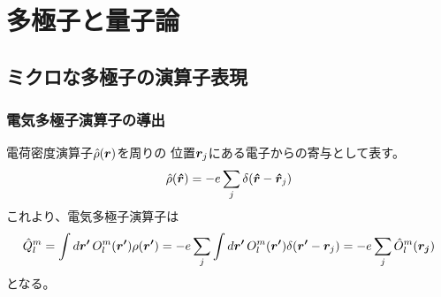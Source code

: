 \documentclass[../../master.tex]{subfiles}
\begin{document}
\chapter{多極子と量子論}
\section{ミクロな多極子の演算子表現}
\subsection*{電気多極子演算子の導出}
電荷密度演算子\(\hat{\rho}(\vb*{r})\)を周りの
位置\(\vb*{r}_j\)にある電子からの寄与として表す。
\begin{equation}
    \hat{\rho}(\vb*{\hat{r}}) = -e\sum_{j} \delta(\vb*{\hat{r}}-\vb*{\hat{r}}_j)
\end{equation}
これより、電気多極子演算子は
\begin{align}
    \hat{Q}_l^m
    = \int d\vb*{r'}\, O_l^m(\vb*{r'}) \rho(\vb*{r'})
    =-e \sum_{j} \int d\vb*{r'}\, O_l^m(\vb*{r'}) \delta(\vb*{r'}-\vb*{r}_j)
    = -e \sum_{j} \hat{O}_l^m(\vb*{r_j})
\end{align}
となる。
\end{document}
